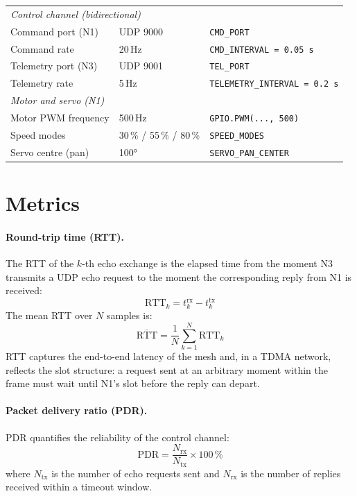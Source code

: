 \begin{table}[h]
\begin{tabular}{lll}
\multicolumn{3}{l}{\textit{Control channel (bidirectional)}} \\
Command port (N1)   & UDP 9000                          & \texttt{CMD\_PORT} \\
Command rate        & 20\,Hz                            & \texttt{CMD\_INTERVAL = 0.05\,s} \\
Telemetry port (N3) & UDP 9001                          & \texttt{TEL\_PORT} \\
Telemetry rate      & 5\,Hz                             & \texttt{TELEMETRY\_INTERVAL = 0.2\,s} \\
\midrule
\multicolumn{3}{l}{\textit{Motor and servo (N1)}} \\
Motor PWM frequency & 500\,Hz                           & \texttt{GPIO.PWM(..., 500)} \\
Speed modes         & 30\,\% / 55\,\% / 80\,\%         & \texttt{SPEED\_MODES} \\
Servo centre (pan)  & 100°                              & \texttt{SERVO\_PAN\_CENTER} \\
\bottomrule
\end{tabular}
\end{table}


\section{Metrics}
\label{sec:metrics}

\paragraph{Round-trip time (RTT).}
The RTT of the $k$-th echo exchange is the elapsed time from the moment N3
transmits a UDP echo request to the moment the corresponding reply from N1
is received:
\begin{equation}
\mathrm{RTT}_k = t^{\mathrm{rx}}_k - t^{\mathrm{tx}}_k
\label{eq:rtt}
\end{equation}
The mean RTT over $N$ samples is:
\begin{equation}
\overline{\mathrm{RTT}} = \frac{1}{N}\sum_{k=1}^{N}\mathrm{RTT}_k
\label{eq:rtt-mean}
\end{equation}
RTT captures the end-to-end latency of the mesh and, in a TDMA network,
reflects the slot structure: a request sent at an arbitrary moment within
the frame must wait until N1's slot before the reply can depart.

\paragraph{Packet delivery ratio (PDR).}
PDR quantifies the reliability of the control channel:
\begin{equation}
\mathrm{PDR} = \frac{N_{\mathrm{rx}}}{N_{\mathrm{tx}}} \times 100\,\%
\label{eq:pdr}
\end{equation}
where $N_{\mathrm{tx}}$ is the number of echo requests sent and
$N_{\mathrm{rx}}$ is the number of replies received within a timeout window.

